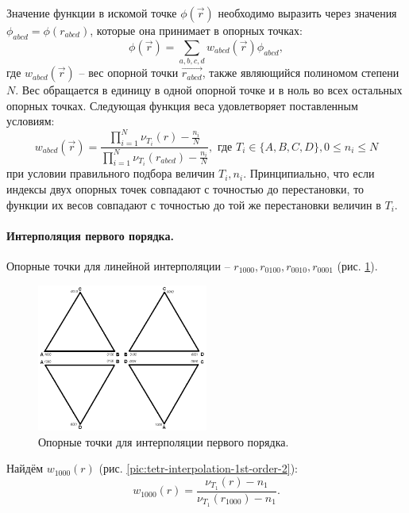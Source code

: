 Значение функции в искомой точке $\phi(\vec{r})$ необходимо выразить через значения $\phi_{abcd} = \phi(r_{abcd})$, которые она принимает в опорных точках:
\begin{equation}
\phi(\vec{r}) = \sum_{a,b,c,d}{w_{abcd}(\vec{r}) \phi_{abcd}},
\end{equation}
где $w_{abcd}(\vec{r})$ -- вес опорной точки $\vec{r_{abcd}}$, также являющийся полиномом степени $N$. Вес обращается в единицу в одной опорной точке и в ноль во всех остальных опорных точках. Следующая функция веса удовлетворяет поставленным условиям:
\begin{equation}
w_{abcd}(\vec{r}) = \frac{ \prod_{i=1}^N{\nu_{T_i}(r) - \frac{n_i}{N}} }{ \prod_{i=1}^N{\nu_{T_i}(r_{abcd}) - \frac{n_i}{N}} }, \textrm{ где } T_i \in \{A, B, C, D\}, 0 \le n_i \le N
\end{equation}
при условии правильного подбора величин ${T_i}, {n_i}$. Принципиально, что если индексы двух опорных точек совпадают с точностью до перестановки, то функции их весов совпадают с точностью до той же перестановки величин в ${T_i}$.

\paragraph{Интерполяция первого порядка.} Опорные точки для линейной интерполяции -- $r_{1000}, r_{0100}, r_{0010}, r_{0001}$ (рис. \ref{pic:tetr-interpolation-1st-order-1}).

\begin{figure}[h]
\centering
\includegraphics[width=0.5\textwidth]{png/tetr-interp-1st-order-1.png}
\caption{Опорные точки для интерполяции первого порядка.}
\label{pic:tetr-interpolation-1st-order-1}
\end{figure}

Найдём $w_{1000}(r)$ (рис. \ref{pic:tetr-interpolation-1st-order-2}):
\begin{equation}
w_{1000}(r) = \frac{ \nu_{T_1}(r) - n_1 }{ \nu_{T_1}(r_{1000}) - n_1 }.
\end{equation}

